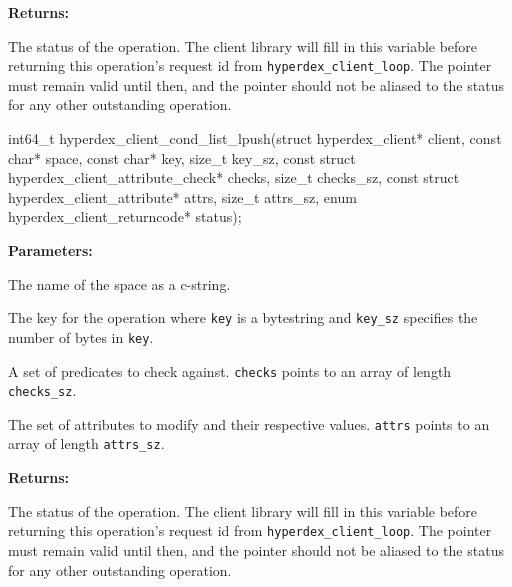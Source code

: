 \noindent\textbf{Returns:}
\begin{description}[labelindent=\widthof{{\texttt{status}}},leftmargin=*,noitemsep,nolistsep,align=right]
\item[\texttt{status}] The status of the operation.  The client library will fill in this variable before returning this operation's request id from \texttt{hyperdex\_client\_loop}.  The pointer must remain valid until then, and the pointer should not be aliased to the status for any other outstanding operation.
\end{description}

\funcsep
\begin{ccode}
int64_t hyperdex_client_cond_list_lpush(struct hyperdex_client* client,
                const char* space,
                const char* key, size_t key_sz,
                const struct hyperdex_client_attribute_check* checks, size_t checks_sz,
                const struct hyperdex_client_attribute* attrs, size_t attrs_sz,
                enum hyperdex_client_returncode* status);
\end{ccode}
\funcdesc 

\noindent\textbf{Parameters:}
\begin{description}[labelindent=\widthof{{\texttt{checks}, \texttt{checks\_sz}}},leftmargin=*,noitemsep,nolistsep,align=right]
\item[\texttt{space}] The name of the space as a c-string.
\item[\texttt{key}, \texttt{key\_sz}] The key for the operation where \texttt{key} is a bytestring and \texttt{key\_sz} specifies the number of bytes in \texttt{key}.
\item[\texttt{checks}, \texttt{checks\_sz}] A set of predicates to check against.  \texttt{checks} points to an array of length \texttt{checks\_sz}.
\item[\texttt{attrs}, \texttt{attrs\_sz}] The set of attributes to modify and their respective values.  \texttt{attrs} points to an array of length \texttt{attrs\_sz}.
\end{description}

\noindent\textbf{Returns:}
\begin{description}[labelindent=\widthof{{\texttt{status}}},leftmargin=*,noitemsep,nolistsep,align=right]
\item[\texttt{status}] The status of the operation.  The client library will fill in this variable before returning this operation's request id from \texttt{hyperdex\_client\_loop}.  The pointer must remain valid until then, and the pointer should not be aliased to the status for any other outstanding operation.
\end{description}

